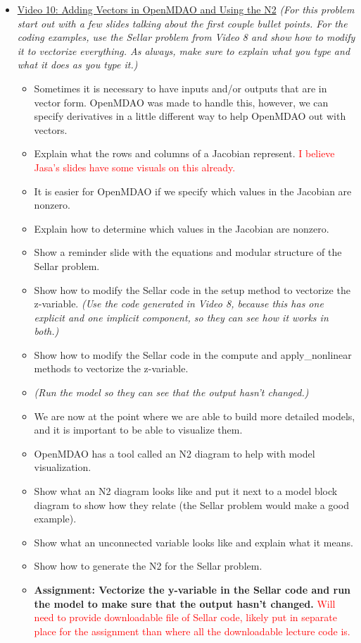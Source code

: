 \documentclass[12pt, letterpaper]{article}
\begin{document}
\begin{itemize}
	\item \underline{Video 10: Adding Vectors in OpenMDAO and Using the N2} \textit{(For this problem start out with a few slides talking about the first couple bullet points. For the coding examples, use the Sellar problem from Video 8 and show how to modify it to vectorize everything. As always, make sure to explain what you type and what it does as you type it.)}
		\begin{itemize}
			\item 	Sometimes it is necessary to have inputs and/or outputs that are in vector form. OpenMDAO was made to handle this, however, we can specify derivatives in a little different way to help OpenMDAO out with vectors.
			\item Explain what the rows and columns of a Jacobian represent. \textcolor{red}{I believe Jasa's slides have some visuals on this already.}
			\item It is easier for OpenMDAO if we specify which values in the Jacobian are nonzero.
			\item Explain how to determine which values in the Jacobian are nonzero.
			\item Show a reminder slide with the equations and modular structure of the Sellar problem.
			\item Show how to modify the Sellar code in the setup method to vectorize the z-variable. \textit{(Use the code generated in Video 8, because this has one explicit and one implicit component, so they can see how it works in both.)}
			\item Show how to modify the Sellar code in the compute and apply\_nonlinear methods to vectorize the z-variable. 
			\item \textit{(Run the model so they can see that the output hasn’t changed.)}
			\item We are now at the point where we are able to build more detailed models, and it is important to be able to visualize them.
			\item OpenMDAO has a tool called an N2 diagram to help with model visualization.
			\item Show what an N2 diagram looks like and put it next to a model block diagram to show how they relate (the Sellar problem would make a good example).
			\item Show what an  unconnected variable looks like and explain what it means.
			\item Show how to generate the N2 for the Sellar problem.
			\item \textbf{Assignment: Vectorize the y-variable in the Sellar code and run the model to make sure that the output hasn’t changed.} \textcolor{red}{Will need to provide downloadable file of Sellar code, likely put in separate place for the assignment than where all the downloadable lecture code is.}
		\end{itemize}


\end{itemize}
\end{document}
